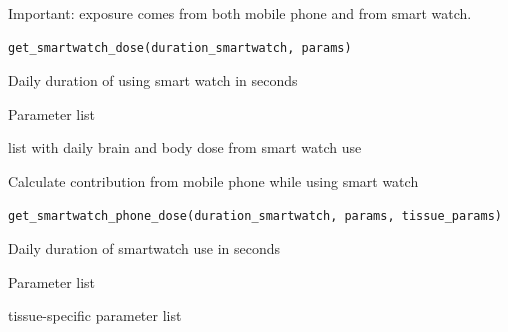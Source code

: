 \documentclass[a4paper]{book}
\begin{document}
%
\begin{Description}
Important: exposure comes from both mobile phone and from smart watch.
\end{Description}
%
\begin{Usage}
\begin{verbatim}
get_smartwatch_dose(duration_smartwatch, params)
\end{verbatim}
\end{Usage}
%
\begin{Arguments}
\begin{ldescription}
\item[\code{duration\_smartwatch}] Daily duration of using smart watch in seconds

\item[\code{params}] Parameter list
\end{ldescription}
\end{Arguments}
%
\begin{Value}
list with daily brain and body dose from smart watch use
\end{Value}
%
\begin{Description}
Calculate contribution from mobile phone while using smart watch
\end{Description}
%
\begin{Usage}
\begin{verbatim}
get_smartwatch_phone_dose(duration_smartwatch, params, tissue_params)
\end{verbatim}
\end{Usage}
%
\begin{Arguments}
\begin{ldescription}
\item[\code{duration\_smartwatch}] Daily duration of smartwatch use in seconds

\item[\code{params}] Parameter list

\item[\code{tissue\_params}] tissue-specific parameter list
\end{ldescription}
\end{Arguments}
\end{document}
